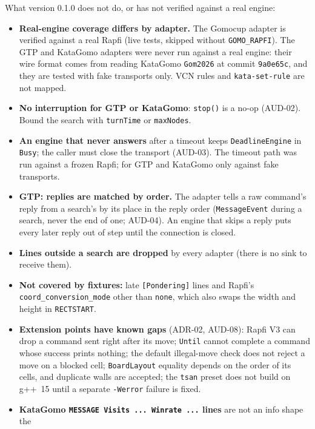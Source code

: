 \documentclass[11pt,a4paper]{article}
\newcommand{\code}[1]{\texttt{#1}}
\begin{document}
What version 0.1.0 does not do, or has not verified against a real engine:

\begin{itemize}
  \item \textbf{Real-engine coverage differs by adapter.} The Gomocup adapter is verified against
        a real Rapfi (live tests, skipped without \code{GOMO\_RAPFI}). The GTP and KataGomo
        adapters were never run against a real engine: their wire format comes from reading
        KataGomo \code{Gom2026} at commit \code{9a0e65c}, and they are tested with fake transports
        only. VCN rules and \code{kata-set-rule} are not mapped.
  \item \textbf{No interruption for GTP or KataGomo}: \code{stop()} is a no-op (AUD-02). Bound the
        search with \code{turnTime} or \code{maxNodes}.
  \item \textbf{An engine that never answers} after a timeout keeps \code{DeadlineEngine} in
        \code{Busy}; the caller must close the transport (AUD-03). The timeout path was run
        against a frozen Rapfi; for GTP and KataGomo only against fake transports.
  \item \textbf{GTP: replies are matched by order.} The adapter tells a raw command's reply from
        a search's by its place in the reply order (\code{MessageEvent} during a search, never the
        end of one; AUD-04). An engine that skips a reply puts every later reply out of step until
        the connection is closed.
  \item \textbf{Lines outside a search are dropped} by every adapter (there is no sink to receive
        them).
  \item \textbf{Not covered by fixtures:} late \code{[Pondering]} lines and Rapfi's
        \code{coord\_conversion\_mode} other than \code{none}, which also swaps the width and height
        in \code{RECTSTART}.
  \item \textbf{Extension points have known gaps} (ADR-02, AUD-08): Rapfi V3 can drop a command sent
        right after its move; \code{Until} cannot complete a command whose success prints nothing;
        the default illegal-move check does not reject a move on a blocked cell;
        \code{BoardLayout} equality depends on the order of its cells, and duplicate walls are
        accepted; the \code{tsan} preset does not build on g++~15 until a separate \code{-Werror}
        failure is fixed.
  \item \textbf{KataGomo \code{MESSAGE Visits ... Winrate ...} lines} are not an info shape the

\end{itemize}
\end{document}
